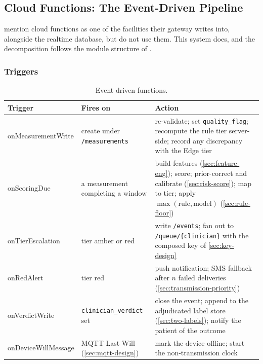 \documentclass[12pt,a4paper,oneside]{report}
\begin{document}
\subsection{Cloud Functions: The Event-Driven Pipeline}\label{sec:functions}

\Textcite{efendi2025} mention cloud functions as one of the facilities their gateway writes into, alongside the realtime database, but do not use them. This system does, and the decomposition follows the module structure of \textcite{yazdani2018}.

\subsubsection{Triggers}

\begin{table}[htbp]
\centering\footnotesize
\caption{Event-driven functions.}\label{tab:triggers}
\begin{tabularx}{\textwidth}{@{}>{\raggedright\arraybackslash\ttfamily\scriptsize}p{3.2cm} >{\raggedright\arraybackslash}p{3.0cm} X@{}}
\toprule
\normalfont\textbf{Trigger} & \textbf{Fires on} & \textbf{Action} \\
\midrule
onMeasurementWrite & create under \texttt{/measurements} & re-validate; set \texttt{quality\_flag}; recompute the rule tier server-side; record any discrepancy with the Edge tier \\
onScoringDue & a measurement completing a window & build features (\cref{sec:feature-eng}); score; prior-correct and calibrate (\cref{sec:risk-score}); map to tier; apply $\max(\text{rule},\text{model})$ (\cref{sec:rule-floor}) \\
onTierEscalation & tier amber or red & write \texttt{/events}; fan out to \texttt{/queue/\{clinician\}} with the composed key of \cref{sec:key-design} \\
onRedAlert & tier red & push notification; SMS fallback after $n$ failed deliveries (\cref{sec:transmission-priority}) \\
onVerdictWrite & \texttt{clinician\_verdict} set & close the event; append to the adjudicated label store (\cref{sec:two-labels}); notify the patient of the outcome \\
onDeviceWillMessage & MQTT Last Will (\cref{sec:mqtt-design}) & mark the device offline; start the non-transmission clock \\
\bottomrule
\end{tabularx}
\end{table}
\end{document}
